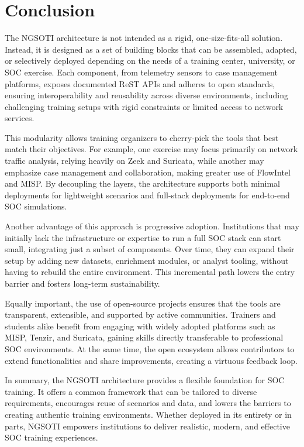 \documentclass[10pt,a4paper]{report}
\begin{document}
\section{Conclusion}
The NGSOTI architecture is not intended as a rigid, one-size-fits-all solution.
Instead, it is designed as a set of building blocks that can be assembled,
adapted, or selectively deployed depending on the needs of a training center,
university, or SOC exercise. Each component, from telemetry sensors to case
management platforms, exposes documented ReST APIs and adheres to open
standards, ensuring interoperability and reusability across diverse
environments, including challenging training setups with rigid constraints or
limited access to network services.

This modularity allows training organizers to cherry-pick the tools that best
match their objectives. For example, one exercise may focus primarily on network
traffic analysis, relying heavily on Zeek and Suricata, while another may
emphasize case management and collaboration, making greater use of FlowIntel and
MISP. By decoupling the layers, the architecture supports both minimal
deployments for lightweight scenarios and full-stack deployments for end-to-end
SOC simulations.

Another advantage of this approach is progressive adoption. Institutions that
may initially lack the infrastructure or expertise to run a full SOC stack can
start small, integrating just a subset of components. Over time, they can expand
their setup by adding new datasets, enrichment modules, or analyst tooling,
without having to rebuild the entire environment. This incremental path lowers
the entry barrier and fosters long-term sustainability.

Equally important, the use of open-source projects ensures that the tools are
transparent, extensible, and supported by active communities. Trainers and
students alike benefit from engaging with widely adopted platforms such as MISP,
Tenzir, and Suricata, gaining skills directly transferable to professional SOC
environments. At the same time, the open ecosystem allows contributors to extend
functionalities and share improvements, creating a virtuous feedback loop.

In summary, the NGSOTI architecture provides a flexible foundation for SOC
training. It offers a common framework that can be tailored to diverse
requirements, encourages reuse of scenarios and data, and lowers the barriers to
creating authentic training environments. Whether deployed in its entirety or in
parts, NGSOTI empowers institutions to deliver realistic, modern, and effective
SOC training experiences.

\end{document}

